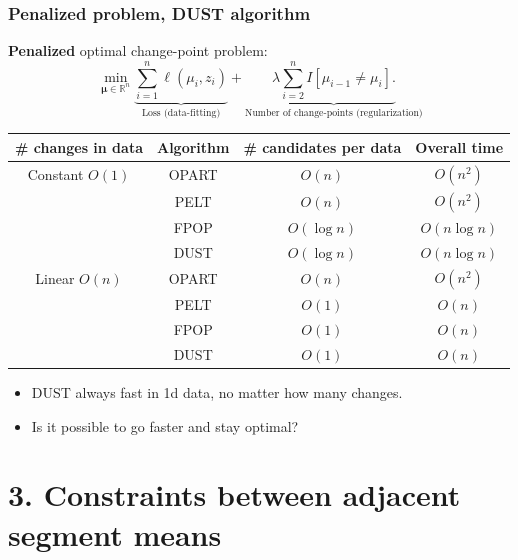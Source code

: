 \documentclass{beamer}
\newcommand{\algo}[1]{\textcolor{#1}{#1}}
\newcommand{\RR}{\mathbb R}
\newcommand{\algo}[1]{\textcolor{#1}{#1}}
\begin{document}
\begin{frame}
  \frametitle{Penalized problem, DUST algorithm}
  \textbf{Penalized} optimal change-point problem:
$$
\min_{
  \mathbf \mu\in\RR^{n}
}
\underbrace{\sum_{i=1}^{n} \ell( \mu_i,  z_i)}_{\text{Loss (data-fitting)}} + \underbrace{\lambda\sum_{i=2}^n I[\mu_{i-1}\neq \mu_i].}_{\text{Number of change-points (regularization)}}
$$
\begin{tabular}{cccc}
  \# changes in data & Algorithm & \# candidates per data & Overall time \\
  \hline
  Constant $O(1)$ & \algo{OPART} &  $O(n)$ & $O(n^2)$\\
                     & \algo{PELT} &  $O(n)$ & $O(n^2)$\\
                     & \algo{FPOP} &  \textcolor{FPOP}{$O(\log n)$} & \textcolor{FPOP}{$O(n\log n)$}\\
                     & \algo{DUST} &  \textcolor{DUST}{$O(\log n)$} & \textcolor{DUST}{$O(n\log n)$}\\
  \hline
  Linear $O(n)$ & \algo{OPART} &  $O(n)$ & $O(n^2)$ \\
   & \algo{PELT} &  \textcolor{PELT}{$O(1)$} & \textcolor{PELT}{$O(n)$} \\
   & \algo{FPOP} &  \textcolor{FPOP}{$O(1)$} & \textcolor{FPOP}{$O(n)$} \\
   & \algo{DUST} &  \textcolor{DUST}{$O(1)$} & \textcolor{DUST}{$O(n)$} \\
\end{tabular}

\begin{itemize}
\item DUST always fast in 1d data, no matter how many changes.
\item Is it possible to go faster and stay optimal?
\end{itemize}
\end{frame}

\section{3. Constraints between adjacent segment means}
\end{document}
